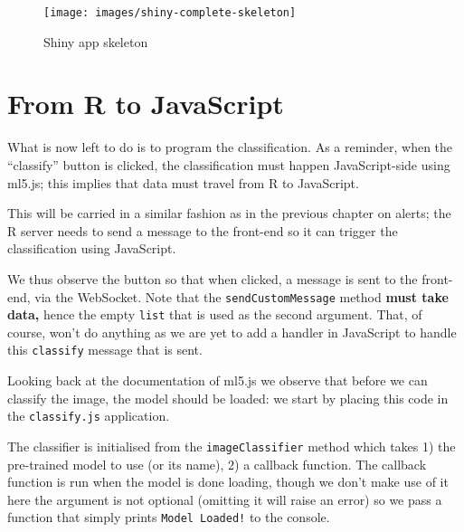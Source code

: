 \documentclass[10pt,]{krantz}
\makeatletter
\newenvironment{Shaded}{\begin{snugshade}}{\end{snugshade}}
\newcommand{\KeywordTok}[1]{\textcolor[rgb]{0.27,0.27,0.27}{\textbf{#1}}}
\newcommand{\NormalTok}[1]{#1}
\newcommand{\OperatorTok}[1]{\textcolor[rgb]{0.43,0.43,0.43}{\textbf{#1}}}
\newcommand{\StringTok}[1]{\textcolor[rgb]{0.5,0.5,0.5}{#1}}
\newenvironment{kframe}{%
\medskip{}
\setlength{\fboxsep}{.8em}
 \def\at@end@of@kframe{}%
 \ifinner\ifhmode%
  \def\at@end@of@kframe{\end{minipage}}%
  \begin{minipage}{\columnwidth}%
 \fi\fi%
 \def\FrameCommand##1{\hskip\@totalleftmargin \hskip-\fboxsep
 \colorbox{shadecolor}{##1}\hskip-\fboxsep
     \hskip-\linewidth \hskip-\@totalleftmargin \hskip\columnwidth}%
 \MakeFramed {\advance\hsize-\width
   \@totalleftmargin\z@ \linewidth\hsize
   \@setminipage}}%
 {\par\unskip\endMakeFramed%
 \at@end@of@kframe}
\renewenvironment{Shaded}{\begin{kframe}}{\end{kframe}}
\makeatother
\begin{document}
\begin{figure}[H]

{\centering \texttt{[image: images/shiny-complete-skeleton]} 

}

\caption{Shiny app skeleton}\label{fig:shiny-complete-skeleton}
\end{figure}

\hypertarget{shiny-complete-r2js}{%
\section{From R to JavaScript}\label{shiny-complete-r2js}}

What is now left to do is to program the classification. As a reminder, when the ``classify'' button is clicked, the classification must happen JavaScript-side using ml5.js; this implies that data must travel from R to JavaScript.

This will be carried in a similar fashion as in the previous chapter on alerts; the R server needs to send a message to the front-end so it can trigger the classification using JavaScript.

\begin{Shaded}
\end{Shaded}

We thus observe the button so that when clicked, a message is sent to the front-end, via the WebSocket. Note that the \texttt{sendCustomMessage} method \textbf{must take data,} hence the empty \texttt{list} that is used as the second argument. That, of course, won't do anything as we are yet to add a handler in JavaScript to handle this \texttt{classify} message that is sent.

Looking back at the documentation of ml5.js we observe that before we can classify the image, the model should be loaded: we start by placing this code in the \texttt{classify.js} application.

The classifier is initialised from the \texttt{imageClassifier} method which takes 1) the pre-trained model to use (or its name), 2) a callback function. The callback function is run when the model is done loading, though we don't make use of it here the argument is not optional (omitting it will raise an error) so we pass a function that simply prints \texttt{Model\ Loaded!} to the console.
\end{document}

